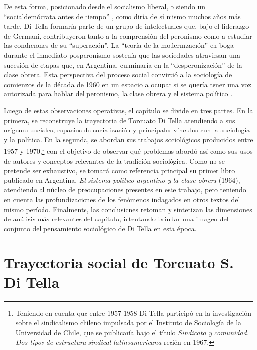 De esta forma, posicionado desde el socialismo liberal, o siendo un \enquote{socialdemócrata antes de tiempo} \parencite[283]{1553-CAMOU2009}, como diría de sí mismo muchos años más tarde, Di Tella formaría parte de un grupo de intelectuales que, bajo el liderazgo de Germani, contribuyeron tanto a la comprensión del peronismo como a estudiar las condiciones de su \enquote{superación}. La \enquote{teoría de la modernización} en boga durante el inmediato posperonismo sostenía que las sociedades atraviesan una sucesión de etapas que, en Argentina, culminaría en la \enquote{desperonización} de la clase obrera. Esta perspectiva del proceso social convirtió a la sociología de comienzos de la década de 1960 en un espacio a ocupar si se quería tener una voz autorizada para hablar del peronismo, la clase obrera y el sistema político \parencite{1548-NEIBURG1998}.

Luego de estas observaciones operativas, el capítulo se divide en tres partes. En la primera, se reconstruye la trayectoria de Torcuato Di Tella atendiendo a sus orígenes sociales, espacios de socialización y principales vínculos con la sociología y la política. En la segunda, se abordan sus trabajos sociológicos producidos entre 1957 y 1970,\footnote{Teniendo en cuenta que entre 1957-1958 Di Tella participó en la investigación sobre el sindicalismo chileno impulsada por el Instituto de Sociología de la Universidad de Chile, que se publicaría bajo el título \emph{Sindicato y comunidad. Dos tipos de estructura sindical latinoamericana} recién en 1967.} con el objetivo de observar qué problemas abordó así como sus usos de autores y conceptos relevantes de la tradición sociológica. Como no se pretende ser exhaustivo, se tomará como referencia principal su primer libro publicado en Argentina, \emph{El sistema político argentino y la clase obrera} (1964), atendiendo al núcleo de preocupaciones presentes en este trabajo, pero teniendo en cuenta las profundizaciones de los fenómenos indagados en otros textos del mismo período. Finalmente, las conclusiones retoman y sintetizan las dimensiones de análisis más relevantes del capítulo, intentando brindar una imagen del conjunto del pensamiento sociológico de Di Tella en esta época.

\section{Trayectoria social de Torcuato S. Di Tella}

